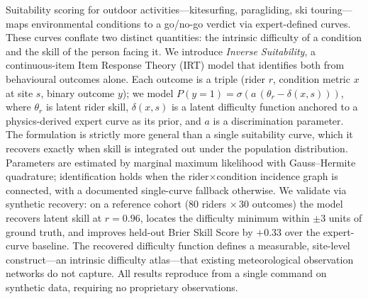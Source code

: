 Suitability scoring for outdoor activities---kitesurfing, paragliding, ski
touring---maps environmental conditions to a go/no-go verdict via expert-defined
curves. These curves conflate two distinct quantities: the intrinsic difficulty
of a condition and the skill of the person facing it. We introduce
\emph{Inverse Suitability}, a continuous-item Item Response Theory (IRT) model
that identifies both from behavioural outcomes alone. Each outcome is a triple
(rider $r$, condition metric $x$ at site $s$, binary outcome $y$); we model
$P(y{=}1) = \sigma\!\left(a\,(\theta_r - \delta(x,s))\right)$, where $\theta_r$ is
latent rider skill, $\delta(x,s)$ is a latent difficulty function anchored to a
physics-derived expert curve as its prior, and $a$ is a discrimination parameter.
The formulation is strictly more general than a single suitability curve, which
it recovers exactly when skill is integrated out under the population
distribution. Parameters are estimated by marginal maximum likelihood with
Gauss--Hermite quadrature; identification holds when the rider${\times}$condition
incidence graph is connected, with a documented single-curve fallback otherwise.
We validate via synthetic recovery: on a reference cohort ($80$ riders
$\times\,30$ outcomes) the model recovers latent skill at $r = 0.96$, locates the
difficulty minimum within $\pm 3$ units of ground truth, and improves held-out
Brier Skill Score by $+0.33$ over the expert-curve baseline. The recovered
difficulty function defines a measurable, site-level construct---an intrinsic
difficulty atlas---that existing meteorological observation networks do not
capture. All results reproduce from a single command on synthetic data, requiring
no proprietary observations.
